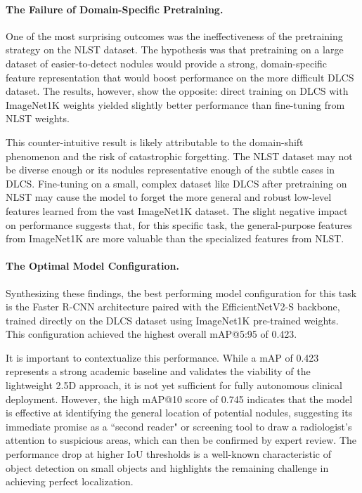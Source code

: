 \paragraph{The Failure of Domain-Specific Pretraining.}
One of the most surprising outcomes was the ineffectiveness of the pretraining strategy on the NLST dataset. The hypothesis was that pretraining on a large dataset of easier-to-detect nodules would provide a strong, domain-specific feature representation that would boost performance on the more difficult DLCS dataset. The results, however, show the opposite: direct training on DLCS with ImageNet1K weights yielded slightly better performance than fine-tuning from NLST weights.

This counter-intuitive result is likely attributable to the domain-shift phenomenon and the risk of catastrophic forgetting. The NLST dataset may not be diverse enough or its nodules representative enough of the subtle cases in DLCS. Fine-tuning on a small, complex dataset like DLCS after pretraining on NLST may cause the model to forget the more general and robust low-level features learned from the vast ImageNet1K dataset. The slight negative impact on performance suggests that, for this specific task, the general-purpose features from ImageNet1K are more valuable than the specialized features from NLST.

\paragraph{The Optimal Model Configuration.}
Synthesizing these findings, the best performing model configuration for this task is the Faster R-CNN architecture paired with the EfficientNetV2-S backbone, trained directly on the DLCS dataset using ImageNet1K pre-trained weights. This configuration achieved the highest overall mAP@5:95 of 0.423.

It is important to contextualize this performance. While a mAP of 0.423 represents a strong academic baseline and validates the viability of the lightweight 2.5D approach, it is not yet sufficient for fully autonomous clinical deployment. However, the high mAP@10 score of 0.745 indicates that the model is effective at identifying the general location of potential nodules, suggesting its immediate promise as a ``second reader" or screening tool to draw a radiologist's attention to suspicious areas, which can then be confirmed by expert review. The performance drop at higher IoU thresholds is a well-known characteristic of object detection on small objects and highlights the remaining challenge in achieving perfect localization.


